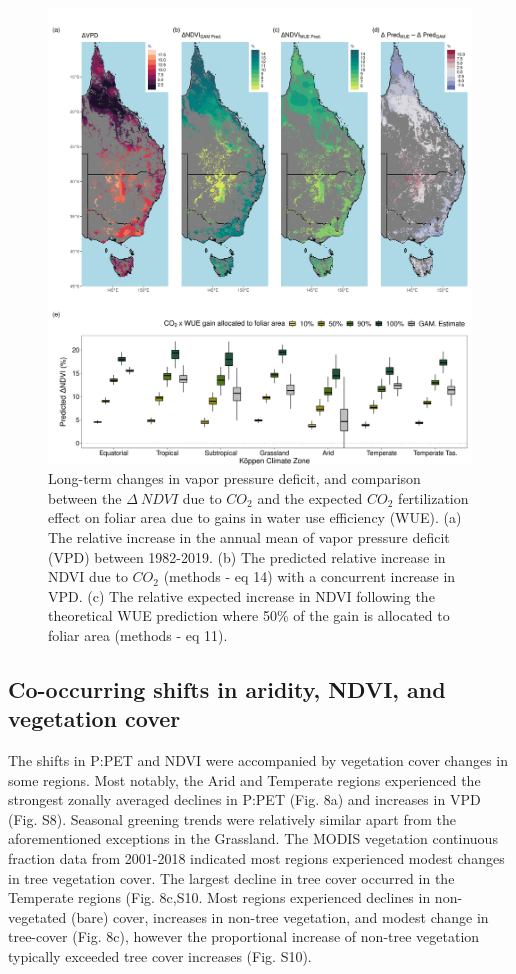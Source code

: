 \documentclass[gc, manuscript]{copernicus}
\begin{document}
\clearpage
\begin{figure}
\includegraphics[width=12cm]{../../figures/Fig7_map_dVpd_gamCO2Pred_wueCO2Pred_dDifferenceBoxplot} \caption{Long-term changes in vapor pressure deficit, and comparison between the $\Delta~NDVI$ due to $CO_2$ and the expected $CO_2$ fertilization effect on foliar area due to gains in water use efficiency (WUE). (a) The relative increase in the annual mean of vapor pressure deficit (VPD) between 1982-2019. (b) The predicted relative increase in NDVI due to $CO_2$ (methods - eq 14) with a concurrent increase in VPD. (c) The relative expected increase in NDVI following the theoretical WUE prediction where 50\% of the gain is allocated to foliar area (methods - eq 11).}\label{fig:unnamed-chunk-6}
\end{figure}
\clearpage

\subsection{Co-occurring shifts in aridity, NDVI, and vegetation cover}

The shifts in P:PET and NDVI were accompanied by vegetation cover
changes in some regions. Most notably, the Arid and Temperate regions
experienced the strongest zonally averaged declines in P:PET (Fig. 8a)
and increases in VPD (Fig. S8). Seasonal greening trends were relatively
similar apart from the aforementioned exceptions in the Grassland. The
MODIS vegetation continuous fraction data from 2001-2018 indicated most
regions experienced modest changes in tree vegetation cover. The largest
decline in tree cover occurred in the Temperate regions (Fig. 8c,S10.
Most regions experienced declines in non-vegetated (bare) cover,
increases in non-tree vegetation, and modest change in tree-cover (Fig.
8c), however the proportional increase of non-tree vegetation typically
exceeded tree cover increases (Fig. S10).
\end{document}
